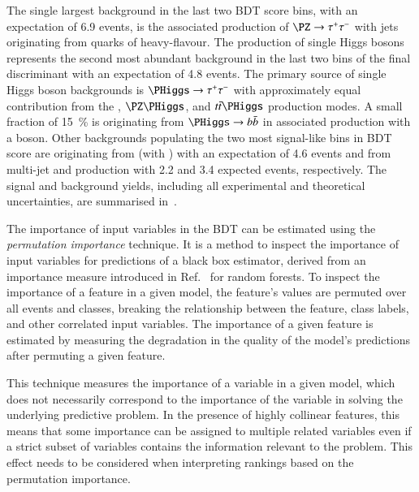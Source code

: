 The single largest background in the last two BDT score bins, with an
expectation of 6.9 events, is the associated production of
$\PZ \rightarrow \tautau$ with jets originating from quarks of
heavy-flavour. The production of single Higgs bosons represents the second most
abundant background in the last two bins of the final discriminant with an
expectation of 4.8 events. The primary source of single Higgs boson backgrounds
is $\PHiggs \rightarrow \tautau$ with approximately equal contribution from the
\ggF, $\PZ\PHiggs$, and $\ttbar\PHiggs$ production modes. A small fraction of
\SI{15}{\percent} is originating from $\PHiggs \rightarrow \bbbar$ in associated
production with a \PZ boson.
Other backgrounds populating the two most signal-like bins in BDT score are
originating from \ttbar (with \truetauhadvis) with an expectation of 4.6 events
and \jettotauhadvis from multi-jet and \ttbar production with 2.2 and 3.4
expected events, respectively. The signal and background yields, including all
experimental and theoretical uncertainties, are summarised
in~.

The importance of input variables in the BDT can be estimated using
the \emph{permutation importance} technique. It is a method to inspect
the importance of input variables for predictions of a black box
estimator, derived from an importance measure introduced in
Ref.~\cite{breiman01} for random forests. To inspect the importance of
a feature in a given model, the feature's values are permuted over all
events and classes, breaking the relationship between the feature,
class labels, and other correlated input variables. The importance of
a given feature is estimated by measuring the degradation in the
quality of the model's predictions after permuting a given feature.

This technique measures the importance of a variable in a given model, which
does not necessarily correspond to the importance of the variable in solving the
underlying predictive problem. In the presence of highly collinear features, this
means that some importance can be assigned to multiple related variables even if
a strict subset of variables contains the information relevant to the
problem. This effect needs to be considered when interpreting rankings based on
the permutation importance.


